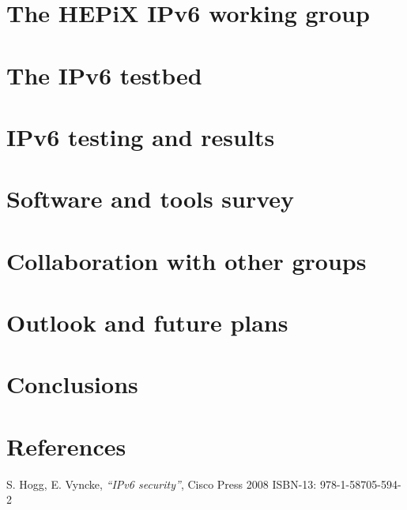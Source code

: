 \documentclass[a4paper]{jpconf}
\begin{document}
\section{The HEPiX IPv6 working group}


\section{The IPv6 testbed}


\section{IPv6 testing and results}


\section{Software and tools survey}


\section{Collaboration with other groups}


\section{Outlook and future plans}


\section{Conclusions}


\par
\section*{References}

\begin{thebibliography}{1}
 S. Hogg, E. Vyncke,
    {\it ``IPv6 security''}, Cisco Press 2008 ISBN-13: 978-1-58705-594-2
\end{thebibliography}
\end{document}
